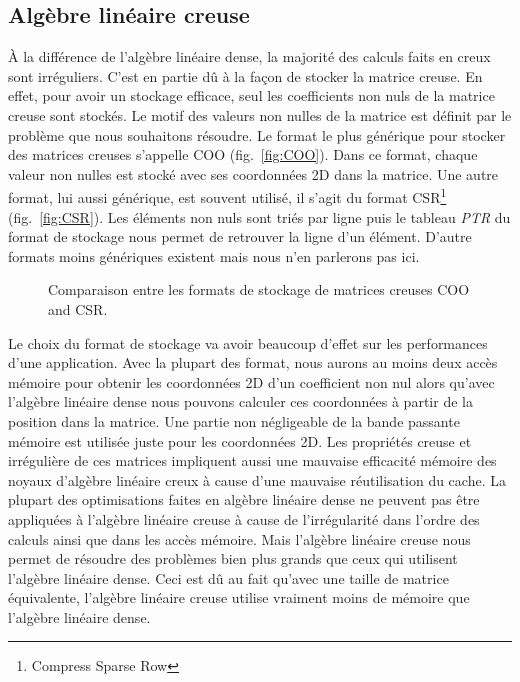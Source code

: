 \subsection{Algèbre linéaire creuse}
\`{A} la différence de l'algèbre linéaire dense, la majorité des calculs faits en creux sont irréguliers.
%
C'est en partie dû à la façon de stocker la matrice creuse.
%
En effet, pour avoir un stockage efficace, seul les coefficients non nuls de la matrice creuse sont stockés.
%
Le motif des valeurs non nulles de la matrice est définit par le problème que nous souhaitons résoudre.
%
Le format le plus générique pour stocker des matrices creuses s'appelle COO (fig.~\ref{fig:COO}).
%
Dans ce format, chaque valeur non nulles est stocké avec ses coordonnées 2D dans la matrice.
%
Une autre format, lui aussi générique, est souvent utilisé, il s'agit du format CSR\footnote{Compress Sparse Row} (fig.~\ref{fig:CSR}).
%
Les éléments non nuls sont triés par ligne puis le tableau {\em PTR} du format de stockage nous permet de retrouver la ligne d'un élément.
%
D'autre formats moins génériques existent mais nous n'en parlerons pas ici.

\begin{figure}[!ht]
     \begin{center}
    \end{center}
    \caption{Comparaison entre les formats de stockage de matrices creuses COO and CSR.}
    \label{fig:matrix_storage}
\end{figure}

Le choix du format de stockage va avoir beaucoup d'effet sur les performances d'une application.
%
Avec la plupart des format, nous aurons au moins deux accès mémoire pour obtenir les coordonnées 2D d'un coefficient non nul alors qu'avec l'algèbre linéaire dense nous pouvons calculer ces coordonnées à partir de la position dans la matrice.
%
Une partie non négligeable de la bande passante mémoire est utilisée juste pour les coordonnées 2D.
%
Les propriétés creuse et irrégulière de ces matrices impliquent aussi une mauvaise efficacité mémoire des noyaux d'algèbre linéaire creux à cause d'une mauvaise réutilisation du cache.
%
La plupart des optimisations faites en algèbre linéaire dense ne peuvent pas être appliquées à l'algèbre linéaire creuse à cause de l'irrégularité dans l'ordre des calculs ainsi que dans les accès mémoire.
%
Mais l'algèbre linéaire creuse nous permet de résoudre des problèmes bien plus grands que ceux qui utilisent l'algèbre linéaire dense.
%
Ceci est dû au fait qu'avec une taille de matrice équivalente, l'algèbre linéaire creuse utilise vraiment moins de mémoire que l'algèbre linéaire dense.



